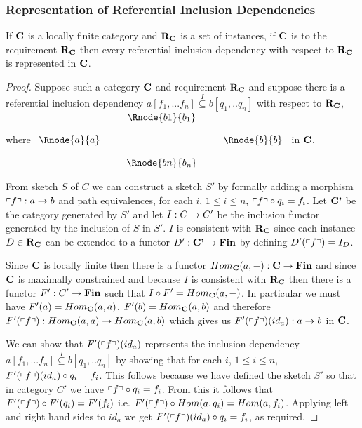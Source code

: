 \subsubsection{Representation of Referential Inclusion Dependencies}
\begin{lemma}
\label{catincdsrepresented}
If $\textbf{C}$ is a locally finite category and $\textbf{R}_{\textbf{C}}$ is a set of instances, if $\textbf{C}$ is 
 to the requirement $\textbf{R}_{\textbf{C}}$ then
every referential inclusion dependency with respect to $\textbf{R}_{\textbf{C}}$ is represented in $\textbf{C}$.
\end{lemma}
\begin{proof}
Suppose such  a category $\textbf{C}$ and  requirement $\textbf{R}_{\textbf{C}}$ 
 and suppose there is a referential inclusion dependency
$a[f_1,...f_n] \overset{I}{\subseteq} b[q_1,..q_n]$ with respect to $\textbf{R}_{\textbf{C}}$,
where
$
\begin{array}{c p{0.25cm} c  p{0.25cm} c }
             &&   \Rnode{b1}{b_1} &&              \\[0.4cm]
\Rnode{a}{a} &&                   && \Rnode{b}{b} \\[0.4cm]
             &&   \Rnode{bn}{b_n} &&              
\end{array} 
$
in $\textbf{C}$, 

From sketch $S$ of $C$ we can construct a sketch $S'$ by formally adding a morphism $\left\ulcorner f\right\urcorner: a \rightarrow b$
and path equivalences, for each $i$, $1 \leq i \leq n$, $\left\ulcorner f\right\urcorner \circ q_i = f_i$. Let $\textbf{C'}$ be the category generated by $S'$ and
let $I: C \rightarrow C'$ be the inclusion functor generated by the inclusion of $S$ in $S'$. $I$ is consistent with $\textbf{R}_{\textbf{C}}$ since
each instance $D \in  \textbf{R}_{\textbf{C}}$ can be  extended to a functor $D': \textbf{C'} \rightarrow \textbf{Fin}$ by defining $D'(\left\ulcorner f\right\urcorner)=I_D$.

Since $\textbf{C}$ is locally finite then there is a functor $Hom_{\textbf{C}}(a,-): \textbf{C} \rightarrow \textbf{Fin}$ and since $\textbf{C}$ is maximally constrained and because $I$ is consistent with $\textbf{R}_{\textbf{C}}$ then there is a functor $F': C' \rightarrow \textbf{Fin}$
such that $I \circ F' = Hom_{\textbf{C}}(a,-)$. In particular we must have 
$F'(a)=Hom_{\textbf{C}}(a,a)$,
$F'(b)=Hom_{\textbf{C}}(a,b)$ and therefore $F'(\left\ulcorner f\right\urcorner):Hom_{\textbf{C}}(a,a) \rightarrow Hom_{\textbf{C}}(a,b)$ which gives us
$F'(\left\ulcorner f\right\urcorner)(id_a): a \rightarrow b$ in $\textbf{C}$. 


We can show that $F'(\left\ulcorner f\right\urcorner)(id_a)$ represents
the inclusion dependency $a[f_1,...f_n] \overset{I}{\subseteq} b[q_1,..q_n]$ by showing that for 
each $i$, $1 \leq i \leq n$, $F'(\left\ulcorner f\right\urcorner)(id_a) \circ q_i = f_i$. This follows because we have defined
the sketch $S'$ so that in category $C'$ we have $\left\ulcorner f\right\urcorner \circ q_i = f_i$. From this it follows
that $F'(\left\ulcorner f\right\urcorner) \circ F'(q_i) = F'(f_i)$ i.e. $F'(\left\ulcorner f\right\urcorner) \circ Hom(a,q_i) = Hom(a,f_i)$. 
Applying left and right hand sides to $id_a$ we get $F'(\left\ulcorner f\right\urcorner)(id_a) \circ q_i = f_i$, as required.
\end{proof}


